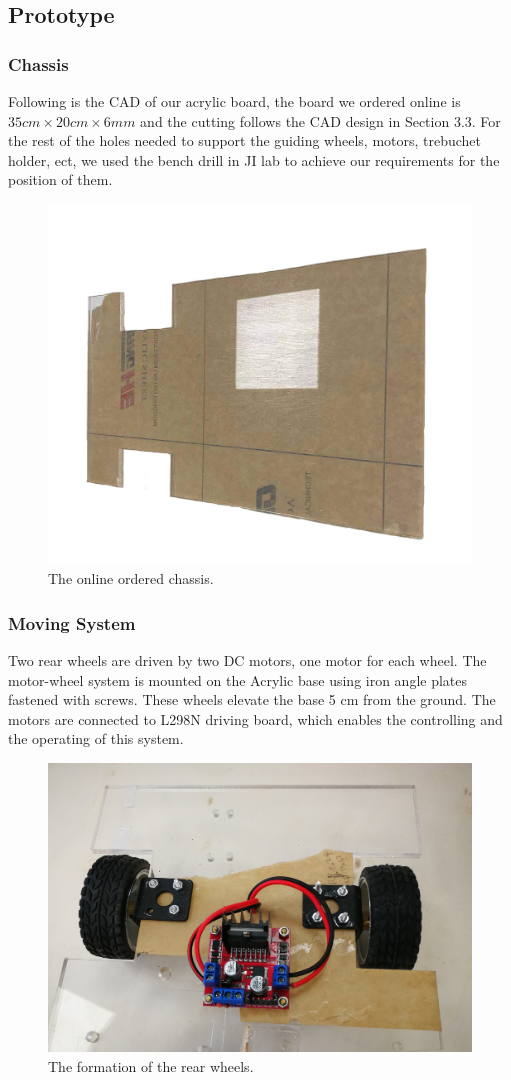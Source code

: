 \documentclass{article}
\begin{document}
\subsection{Prototype}
\subsubsection*{Chassis}
Following is the CAD of our acrylic board, the board we ordered online is $35cm\times 20cm\times 6mm $ and the cutting follows the CAD design in Section 3.3. For the rest of the holes needed to support the guiding wheels, motors, trebuchet holder, ect, we used the bench drill in JI lab to achieve our requirements for the position of them. 

\begin{figure}[H]
\centering
\includegraphics[width=0.4\linewidth]{5}
\caption{The online ordered chassis.}
\end{figure}


\subsubsection*{Moving System}
Two rear wheels are driven by two DC motors, one motor for each wheel. The motor-wheel system is mounted on the Acrylic base using iron angle plates fastened with screws. These wheels elevate the base 5 cm from the ground. The motors are connected to L298N driving board, which enables the controlling and the operating of this system.
\begin{figure}[H]
\centering
\includegraphics[width=0.5\linewidth]{wheel1}
\caption{The formation of the rear wheels.}
\end{figure}
\end{document}
